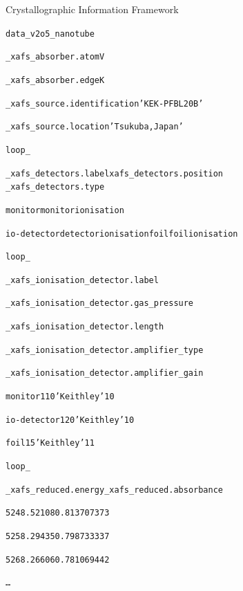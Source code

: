\documentclass[final]{beamer}
\begin{document}
\begin{frame}{}
\begin{columns}[t]
\begin{column}{.34\linewidth}
\begin{block}{Crystallographic Information Framework}
          \begin{center} \begin{minipage}{0.66\linewidth}
              \begin{alltt}
                {\tiny
                  data\_v2o5\_nanotube\par
                  \_xafs\_absorber.atom   V\par
                  \_xafs\_absorber.edge    K\par
                  \_xafs\_source.identification   'KEK-PF BL20B'\par
                  \_xafs\_source.location         'Tsukuba, Japan'\par
                  loop\_\par
                  \_xafs\_detectors.label xafs\_detectors.position
                  \_xafs\_detectors.type\par
                  monitor      monitor    ionisation\par
                  io-detector  detector   ionisation    foil         foil       ionisation\par
                  \par
                  loop\_\par
                  \_xafs\_ionisation\_detector.label\par
                  \_xafs\_ionisation\_detector.gas\_pressure\par
                  \_xafs\_ionisation\_detector.length\par
                  \_xafs\_ionisation\_detector.amplifier\_type\par
                  \_xafs\_ionisation\_detector.amplifier\_gain\par
                  monitor         1      10    'Keithley'    10\par
                  io-detector     1      20    'Keithley'    10\par
                  foil            1      5     'Keithley'    11\par
                  \par
                  loop\_\par
                  \_xafs\_reduced.energy \_xafs\_reduced.absorbance\par
                  5248.52108 0.813707373\par
                  5258.29435 0.798733337\par
                  5268.26606 0.781069442\par
                  \ldots\par
                }
              \end{alltt}
              \end{minipage} \end{center}



\end{block}
\end{column}
\end{columns}
\end{frame}
\end{document}
